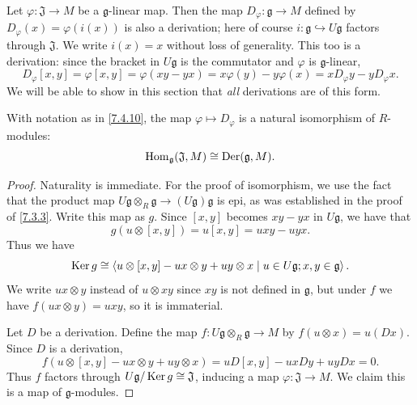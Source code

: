 \begin{example}\label{7.4.10}
	Let $\varphi : \mathfrak{J}  \to M$ be a $\mathfrak{g} $-linear map. Then the map $D_\varphi : \mathfrak{g}  \to M$ defined by $D_\varphi (x)=\varphi (i(x))$ is also a derivation; here of course $i : \mathfrak{g} \hookrightarrow U\mathfrak{g} $ factors through $\mathfrak{J} $. We write $i(x)=x$ without loss of generality. This too is a derivation: since the bracket in $U\mathfrak{g} $ is the commutator and $\varphi $ is $\mathfrak{g} $-linear,
	\[
		D_\varphi [x,y]=\varphi[x,y]=\varphi (xy-yx)=x\varphi (y)-y\varphi (x)=xD_\varphi y-yD_\varphi x
	.\]
	We will be able to show in this section that \emph{all} derivations are of this form.
\end{example}
\begin{lemma}\label{7.4.11}
	With notation as in \cref{7.4.10}, the map $\varphi \mapsto D_\varphi $ is a natural isomorphism of $R$-modules:
	\[
		\operatorname{Hom}_\mathfrak{g} (\mathfrak{J} , M) \cong \operatorname{Der} (\mathfrak{g},M)
	.\]
\end{lemma}
\begin{proof}
	Naturality is immediate. For the proof of isomorphism, we use the  fact that the product map $U\mathfrak{g} \otimes _R\mathfrak{g} \to (U\mathfrak{g} )\mathfrak{g} $ is epi, as was established in the proof of \cref{7.3.3}. Write this map as $g$. Since $[x,y]$ becomes $xy-yx$ in $U\mathfrak{g} $, we have that
	\[
		g(u\otimes [x,y]) = u[x,y] = uxy-uyx
	.\]
	Thus we have
	\[
		\operatorname{Ker} g\cong \left\langle u\otimes [x,y]-ux\otimes y + uy\otimes x \mid u\in U\mathfrak{g} ;x,y\in \mathfrak{g}  \right\rangle 
	.\]
	We write $ux\otimes y$ instead of $u\otimes xy$ since $xy$ is not defined in $\mathfrak{g} $, but under $f$ we have $f(ux\otimes y)=uxy$, so it is immaterial.

	Let $D$ be a derivation. Define the map $f : U\mathfrak{g} \otimes _R\mathfrak{g}  \to M$ by $f(u\otimes x)=u(Dx)$. Since $D$ is a derivation,
	\[
		f(u\otimes [x,y]-ux\otimes y + uy\otimes x) = uD[x,y]-uxDy + uyDx=0
	.\]
	Thus $f$ factors through $U\mathfrak{g} / \operatorname{Ker} g \cong \mathfrak{J} $, inducing a map $\varphi : \mathfrak{J}  \to M$. We claim this is a map of $\mathfrak{g} $-modules.
\end{proof}

